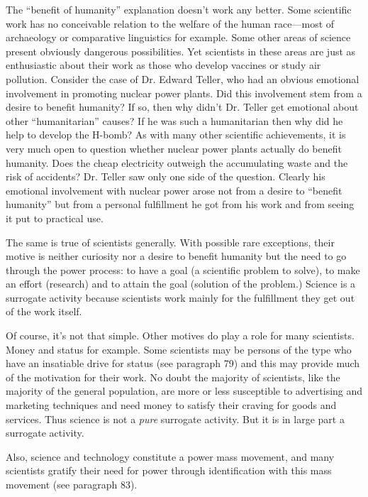  The “benefit of humanity” explanation doesn’t work any better. Some scientific work has no conceivable relation to the welfare of the human race—most of archaeology or comparative linguistics for example. Some other areas of science present obviously dangerous possibilities. Yet scientists in these areas are just as enthusiastic about their work as those who develop vaccines or study air pollution. Consider the case of Dr. Edward Teller, who had an obvious emotional involvement in promoting nuclear power plants. Did this involvement stem from a desire to benefit humanity? If so, then why didn’t Dr. Teller get emotional about other “humanitarian” causes? If he was such a humanitarian then why did he help to develop the H-bomb? As with many other scientific achievements, it is very much open to question whether nuclear power plants actually do benefit humanity. Does the cheap electricity outweigh the accumulating waste and the risk of accidents? Dr. Teller saw only one side of the question. Clearly his emotional involvement with nuclear power arose not from a desire to “benefit humanity” but from a personal fulfillment he got from his work and from seeing it put to practical use.

 The same is true of scientists generally. With possible rare exceptions, their motive is neither curiosity nor a desire to benefit humanity but the need to go through the power process: to have a goal (a scientific problem to solve), to make an effort (research) and to attain the goal (solution of the problem.) Science is a surrogate activity because scientists work mainly for the fulfillment they get out of the work itself.

 Of course, it’s not that simple. Other motives do play a role for many scientists. Money and status for example. Some scientists may be persons of the type who have an insatiable drive for status (see paragraph 79) and this may provide much of the motivation for their work. No doubt the majority of scientists, like the majority of the general population, are more or less susceptible to advertising and marketing techniques and need money to satisfy their craving for goods and services. Thus science is not a {\em pure} surrogate activity. But it is in large part a surrogate activity.

 Also, science and technology constitute a power mass movement, and many scientists gratify their need for power through identification with this mass movement (see paragraph 83).

